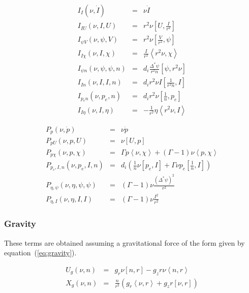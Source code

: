 \documentclass[letterpaper]{book}
\newcommand{\gs}[1]{\Delta^* #1}
\newcommand{\pb}[2]{\left[#1,#2\right]}
\newcommand{\ip}[2]{\left\langle  #1,#2\right\rangle}
\begin{document}
\begin{equation}
  \begin{array}{lcl}
    I_I (\nu, \dot{I}) & = & \nu \dot{I}\\
    I_{I U}(\nu, I, U) & = & r^2 \nu \pb{U}{\frac{I}{r^2}}\\
    I_{\psi V}(\nu, \psi, V) & = & r^2 \nu \pb{\frac{V}{r^2}}{\psi}\\
    I_{I \chi}(\nu, I, \chi) & = & \frac{I}{r^2} \ip{r^2 \nu}{\chi}\\
    I_{\psi n}(\nu, \psi, \psi, n) & = &
       d_i \frac{\gs{\psi}}{r^2 n}\pb{\psi}{r^2\nu}\\
    I_{I n}(\nu, I, I, n) & = &
       d_i r^2 \nu I \pb{\frac{1}{r^2 n}}{I}\\
    I_{p_e n}(\nu, p_e, n) & = & d_i r^2 \nu \pb{\frac{1}{n}}{p_e}\\
    I_{I \eta}(\nu, I, \eta) & = & -\frac{1}{r^2} \eta \ip{r^2 \nu}{I}
  \end{array}
\end{equation}

\begin{equation}
  \begin{array}{lcl}
  P_p(\nu, \dot{p}) & = & \nu \dot{p}
  \\
  P_{p U}(\nu, p, U) & = & \nu \pb{U}{p}
  \\
  P_{p \chi}(\nu, p, \chi) & = & \Gamma p \ip{\nu}{\chi} 
    + (\Gamma - 1) \nu \ip{p}{\chi}
  \\
  P_{p_e, I, n}(\nu, p_e, I, n) & = & d_i \left( 
      \frac{1}{n} \nu \pb{p_e}{I} 
    + \Gamma \nu p_e \pb{\frac{1}{n}}{I} \right)
  \\
  P_{\eta, \psi}(\nu, \eta, \psi, \psi) & = & (\Gamma - 1) \nu
  \frac{(\gs{\psi})^2}{r^2}
  \\
  P_{\eta, I}(\nu, \eta, I, I) & = & (\Gamma - 1) \nu \frac{I^2}{r^2}
  \end{array}
\end{equation}

\subsubsection{Gravity}

These terms are obtained assuming a gravitational force of the form given by
equation~(\ref{eq:gravity}).

\begin{equation}
  \begin{array}{lcl}
    U_g(\nu, n) & = & g_r \nu \pb{n}{r} - g_z r \nu \ip{n}{r}
    \\
    X_g(\nu, n) & = & \frac{n}{r^2} \left( 
    g_r \ip{\nu}{r} + g_z r \pb{\nu}{r} \right)
  \end{array}
\end{equation}
\end{document}
